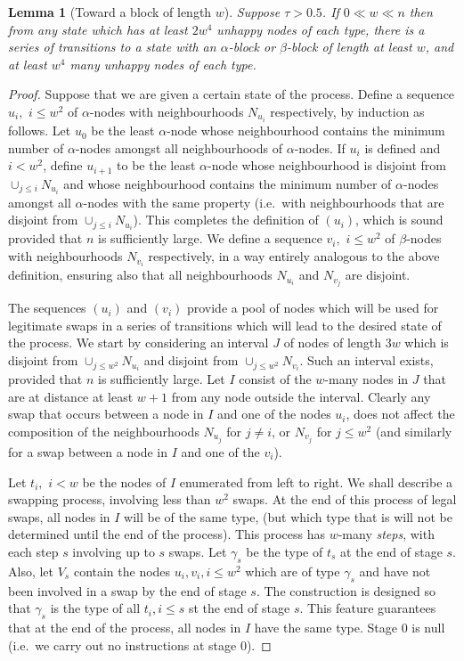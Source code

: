\documentclass[11pt]{article}
\theoremstyle{plain}
\newtheorem{lem}[thm]{Lemma}
\numberwithin{equation}{subsection}
\begin{document}
\begin{lem}[Toward a block of length $w$]\label{le:toblolw}
Suppose $\tau>0.5$. If $0\ll w \ll n$ then from any state which has at least $2w^4$ unhappy nodes of each type,
there is a series of transitions to a state with an
$\alpha$-block or $\beta$-block of length at least $w$, and at least $w^4$ many unhappy nodes of each type.
\end{lem}
\begin{proof}
Suppose that we are given a certain state of the process.
Define a sequence $u_i,$ $ i\leq w^2$ of $\alpha$-nodes with neighbourhoods
$N_{u_i}$  respectively, by induction as follows. Let $u_0$ be the least $\alpha$-node
whose neighbourhood contains the minimum number of $\alpha$-nodes amongst all
neighbourhoods of $\alpha$-nodes. If $u_i$ is defined and $i<w^2$, define $u_{i+1}$
to be the least $\alpha$-node whose neighbourhood is disjoint from 
$\cup_{j\leq i} N_{u_i}$ and whose neighbourhood contains the 
minimum number of $\alpha$-nodes amongst all $\alpha$-nodes with the same
property (i.e.\ with neighbourhoods that are disjoint from $\cup_{j\leq i} N_{u_i}$).
This completes the definition of $(u_i)$, which is sound provided that $n$ 
is sufficiently large.
We define a sequence $v_i,$ $ i\leq w^2$ of $\beta$-nodes 
with neighbourhoods $N_{v_i}$ respectively, in a way entirely analogous to the above
definition, ensuring also that all neighbourhoods $N_{u_i}$ and $N_{v_j}$ are disjoint.  

The sequences $(u_i)$ and $(v_i)$ provide a pool of nodes which will be used
for legitimate swaps in a series of transitions which will lead to the desired state
of the process. We start by considering an interval $J$ of nodes of length $3w$
which is disjoint from $\cup_{j\leq w^2} N_{u_i}$ and disjoint from 
$\cup_{j\leq w^2} N_{v_i}$.
Such an interval exists, provided that $n$ is sufficiently large. Let $I$ 
consist of the $w$-many nodes
in $J$ that are at distance at least $w+1$ from any node outside the interval.
Clearly any swap that occurs between a node in $I$ and
one of the nodes $u_i$, does not affect the composition of the neighbourhoods $N_{u_j}$ for $j\neq i$,
or $N_{v_j}$ for  $j\leq w^2$ (and similarly for a swap between a node in $I$ and one of the $v_i$). 

Let $t_i,$ $ i<w$ be the nodes of $I$ enumerated
from left to right. We shall describe a swapping process,  involving less than $w^2$ swaps.  At the end of this process of legal swaps, all nodes in $I$ will be of the same type, (but which type that is will not be determined until the end of the process). 
This process has $w$-many \emph{steps}, with each step $s$ involving up to $s$ swaps.
Let $\gamma_s$ be the type of $t_s$ at the end of stage $s$. 
Also, let  $V_{s}$ contain the nodes $u_i, v_i, i\leq w^2$ which are of type
$\gamma_{s}$ and have not been involved in a swap by the end of stage $s$.
The construction
is designed so that 
 $\gamma_s$ is the type of all $t_i, i\leq s$ st the end of stage $s$. This feature
 guarantees that at the end of the process, all nodes in $I$ have the same type.
Stage 0 is null (i.e.\ we carry out no instructions at stage 0). 


\end{proof}
\end{document}
